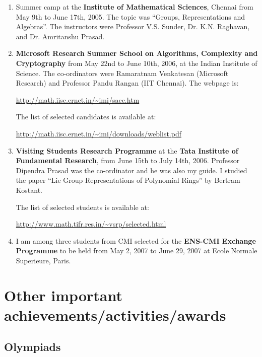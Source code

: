 \documentclass[12pt,a4paper,oneside]{amsart}
\begin{document}
\begin{enumerate}

\item Summer camp at the {\bf Institute of Mathematical Sciences},
  Chennai from May
  9th to June 17th, 2005. The topic was ``Groups, Representations and
  Algebras''. The instructors were Professor V.S. Sunder, Dr. K.N.
  Raghavan, and Dr. Amritanshu Prasad.

\item {\bf Microsoft Research Summer School on Algorithms, Complexity
    and Cryptography} from May 22nd to June 10th, 2006, at the Indian
  Institute of Science. The co-ordinators were Ramaratnam Venkatesan
  (Microsoft Research) and Professor Pandu Rangan (IIT Chennai). The
  webpage is:

  \url{http://math.iisc.ernet.in/~imi/sacc.htm}

  The list of selected candidates is available at:

  \url{http://math.iisc.ernet.in/~imi/downloads/weblist.pdf}

\item {\bf Visiting Students Research Programme} at the 
  {\bf Tata Institute of Fundamental Research}, 
  from June 15th to July 14th, 2006. Professor
  Dipendra Prasad was the co-ordinator and he was also my guide. I
  studied the paper ``Lie Group Representations of Polynomial Rings''
  by Bertram Kostant.

  The list of selected students is available at:

  \url{http://www.math.tifr.res.in/~vsrp/selected.html}

\item I am among three students from CMI selected for the {\bf ENS-CMI
    Exchange Programme} to be held from May 2, 2007 to June 29, 2007
  at Ecole Normale Superieure, Paris.

\end{enumerate}

\section{Other important achievements/activities/awards}

\subsection{Olympiads}
\end{document}
